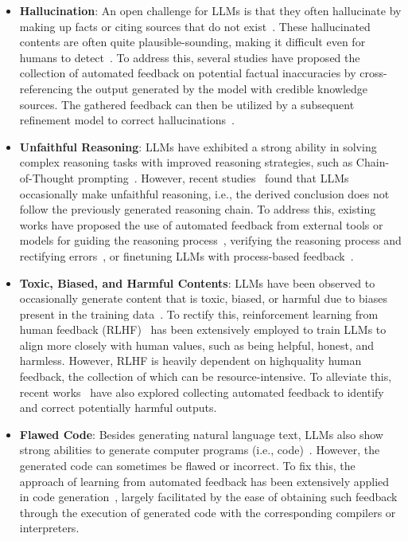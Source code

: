 \documentclass[a4paper,oneside]{book}
\begin{document}
\begin{itemize}
    \item \textbf{Hallucination}: An open challenge for LLMs is that they often hallucinate by making up facts or citing sources that do not exist~\cite{li2023halueval, zhang2023language}. These hallucinated contents are often quite plausible-sounding, making it difficult even for humans to detect~\cite{clark2021thats}. To address this, several studies have proposed the collection of automated feedback on potential factual inaccuracies by cross-referencing the output generated by the model with credible knowledge sources. The gathered feedback can then be utilized by a subsequent refinement model to correct hallucinations~\cite{gao2023rarr, zhang2023language}.

    \item \textbf{Unfaithful Reasoning}: LLMs have exhibited a strong ability in solving complex reasoning tasks with improved reasoning strategies, such as Chain-of-Thought prompting~\cite{wei2023chainofthought}. However, recent studies~\cite{golovneva2023roscoe,ribeiro2023street,lyu2023faithful} found that LLMs occasionally make unfaithful reasoning, i.e., the derived conclusion does not follow the previously generated reasoning chain. To address this, existing works have proposed the use of automated feedback from external tools or models for guiding the reasoning process~\cite{xie2023selfevaluation, yao2023tree}, verifying the reasoning process and rectifying errors~\cite{he2022rethinking,pan2023logiclm}, or finetuning LLMs with process-based feedback~\cite{huang2022large, lightman2023lets}.

    \item \textbf{Toxic, Biased, and Harmful Contents}: LLMs have been observed to occasionally generate content that is toxic, biased, or harmful due to biases present in the training data~\cite{shaikh-etal-2023-second}. To rectify this, reinforcement learning from human feedback (RLHF)~\cite{ouyang2022training, bai2022training} has been extensively employed to train LLMs to align more closely with human values, such as being helpful, honest, and harmless. However, RLHF is heavily dependent on highquality human feedback, the collection of which can be resource-intensive. To alleviate this, recent works~\cite{lu2022quark, gou2023critic} have also explored collecting automated feedback to identify and correct potentially harmful outputs.

    \item \textbf{Flawed Code}: Besides generating natural language text, LLMs also show strong abilities to generate computer programs (i.e., code)~\cite{chen2022codet}. However, the generated code can sometimes be flawed or incorrect. To fix this, the approach of learning from automated feedback has been extensively applied in code generation~\cite{chen2023teaching, olausson2023selfrepair}, largely facilitated by the ease of obtaining such feedback through the execution of generated code with the corresponding compilers or interpreters.
\end{itemize}
\end{document}

